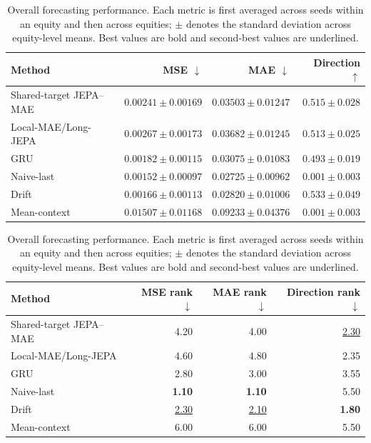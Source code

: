 \begin{table}[t]
\centering
\small
\caption{Overall forecasting performance. Each metric is first averaged across seeds within an equity and then across equities; $\pm$ denotes the standard deviation across equity-level means. Best values are bold and second-best values are underlined.}
\label{tab:main_metrics}
\begin{tabular}{lrrr}
\toprule
Method & MSE $\downarrow$ & MAE $\downarrow$ & Direction $\uparrow$ \\
\midrule
Shared-target JEPA--MAE & $0.00241 \pm 0.00169$ & $0.03503 \pm 0.01247$ & \underline{$0.515 \pm 0.028$} \\
Local-MAE/Long-JEPA & $0.00267 \pm 0.00173$ & $0.03682 \pm 0.01245$ & $0.513 \pm 0.025$ \\
GRU & $0.00182 \pm 0.00115$ & $0.03075 \pm 0.01083$ & $0.493 \pm 0.019$ \\
Naive-last & \textbf{$0.00152 \pm 0.00097$} & \textbf{$0.02725 \pm 0.00962$} & $0.001 \pm 0.003$ \\
Drift & \underline{$0.00166 \pm 0.00113$} & \underline{$0.02820 \pm 0.01006$} & \textbf{$0.533 \pm 0.049$} \\
Mean-context & $0.01507 \pm 0.01168$ & $0.09233 \pm 0.04376$ & $0.001 \pm 0.003$ \\
\bottomrule
\end{tabular}
\par\medskip
\begin{tabular}{lrrr}
\toprule
Method & MSE rank $\downarrow$ & MAE rank $\downarrow$ & Direction rank $\downarrow$ \\
\midrule
Shared-target JEPA--MAE & 4.20 & 4.00 & \underline{2.30} \\
Local-MAE/Long-JEPA & 4.60 & 4.80 & 2.35 \\
GRU & 2.80 & 3.00 & 3.55 \\
Naive-last & \textbf{1.10} & \textbf{1.10} & 5.50 \\
Drift & \underline{2.30} & \underline{2.10} & \textbf{1.80} \\
Mean-context & 6.00 & 6.00 & 5.50 \\
\bottomrule
\end{tabular}
\end{table}
